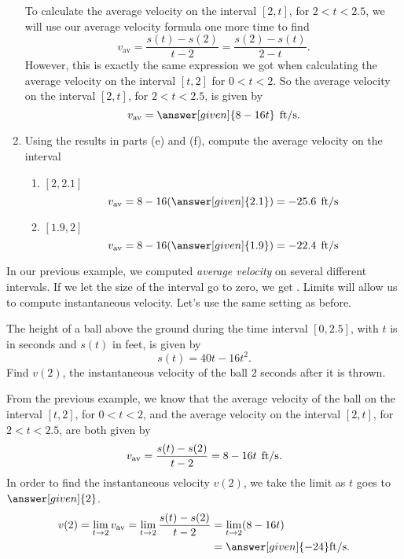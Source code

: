 \documentclass{ximera}
\begin{document}
\begin{example}
\begin{enumerate}
\begin{explanation}
To calculate the average velocity on the interval $[2,t]$, for 
$2<t<2.5$, we will use our average velocity formula one more time
to find
\[
v_{\text{av}} = \frac{s(t)-s(2)}{t-2} = \frac{s(2)-s(t)}{2-t}. 
\]
However, this is exactly the same expression we got when calculating
the average velocity on the interval $[t,2]$ for $0<t<2$.  So the 
average velocity on the interval $[2,t]$, for $2<t<2.5$, is given by
\[
v_{\text{av}} =\answer[given]{8-16t}\hspace{0.06in}\text{ft/s}.
\]
\end{explanation}
\item Using the results in parts (e) and (f), compute the average velocity on the interval
\begin{explanation}
\begin{enumerate}
\item $[2, 2.1]$
\[
v_{\text{av}} =  8-16(\answer[given]{2.1})=-25.6 \hspace{0.06in}\text{ft/s}
\]
\item $[1.9,2]$
\[
v_{\text{av}} =  8-16(\answer[given]{1.9})=-22.4 \hspace{0.06in}\text{ft/s}
\]
\end{enumerate}
\end{explanation}
\end{enumerate}
\end{example}

In our previous example, we computed \textit{average velocity} on
several different intervals. If we let the size of the interval go to
zero, we get . Limits will allow us to
compute instantaneous velocity.  Let's use the same setting as before.

\begin{example}
The height of a ball above the ground during the time interval  $[0,2.5]$, with $t$ is in seconds and $s(t)$ in feet, 
is given by
\[
s(t) = 40t - 16t^2.
\] 
Find $v(2)$, the instantaneous velocity of the ball $2$ seconds after it
is thrown.

\begin{explanation}
From the previous example, we know that the average velocity of the
ball on the interval $[t,2]$, for $0<t<2$, and the average velocity
on the interval $[2,t]$, for $2<t<2.5$, are both given by
\[
v_{\text{av}} =  \frac{s(t)-s(2)}{t-2}= 8-16t \hspace{0.06in}\text{ft/s}.
\]
In order to find the instantaneous velocity $v(2)$, we 
take the limit as $t$ goes to $\answer[given]{2}$. 
\begin{align*}
v (2)= \lim_{t\to2}v_{\text{av}}
=\lim_{t\to2}  \frac{s(t)-s(2)}{t-2}
&= \lim_{t\to2}(8-16t)\\
&= \answer[given]{-24}\text{ft/s}.
\end{align*}
\end{explanation}
\end{example}
\end{document}
